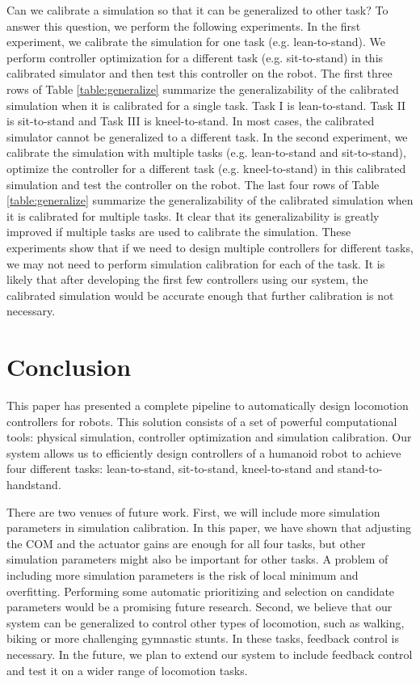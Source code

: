 Can we calibrate a simulation so that it can be generalized to other task? To answer this question, we perform the following experiments. In the first experiment, we calibrate the simulation for one task (e.g. lean-to-stand). We perform controller optimization for a different task (e.g. sit-to-stand) in this calibrated simulator and then test this controller on the robot. The first three rows of Table \ref{table:generalize} summarize the generalizability of the calibrated simulation when it is calibrated for a single task. Task I is lean-to-stand. Task II is sit-to-stand and Task III is kneel-to-stand. In most cases, the calibrated simulator cannot be generalized to a different task. In the second experiment, we calibrate the simulation with multiple tasks (e.g. lean-to-stand and sit-to-stand), optimize the controller for a different task (e.g. kneel-to-stand) in this calibrated simulation and test the controller on the robot. The last four rows of Table \ref{table:generalize} summarize the generalizability of the calibrated simulation when it is calibrated for multiple tasks. It clear that its generalizability is greatly improved if multiple tasks are used to calibrate the simulation. These experiments show that if we need to design multiple controllers for different tasks, we may not need to perform simulation calibration for each of the task. It is likely that after developing the first few controllers using our system, the calibrated simulation would be accurate enough that further calibration is not necessary.

\section{Conclusion}

This paper has presented a complete pipeline to automatically design locomotion controllers for robots. This solution consists of a set of powerful computational tools: physical simulation, controller optimization and simulation calibration. Our system allows us to efficiently design controllers of a humanoid robot to achieve four different tasks: lean-to-stand, sit-to-stand, kneel-to-stand and stand-to-handstand.

There are two venues of future work. First, we will include more simulation parameters in simulation calibration. In this paper, we have shown that adjusting the COM and the actuator gains are enough for all four tasks, but other simulation parameters might also be important for other tasks. A problem of including more simulation parameters is the risk of local minimum and overfitting. Performing some automatic prioritizing and selection on candidate parameters would be a promising future research. Second, we believe that our system can be generalized to control other types of locomotion, such as walking, biking or more challenging gymnastic stunts. In these tasks, feedback control is necessary. In the future, we plan to extend our system to include feedback control and test it on a wider range of locomotion tasks.
